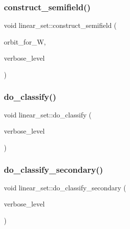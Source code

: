 \mbox{\label{classlinear__set_ab54b164771526ae8d687751aa2d1a9ce}} 
\subsubsection{\texorpdfstring{construct\+\_\+semifield()}{construct\_semifield()}}
{\footnotesize\ttfamily void linear\+\_\+set\+::construct\+\_\+semifield (\begin{DoxyParamCaption}\item[{\mbox{\hyperlink{galois_8h_a09fddde158a3a20bd2dcadb609de11dc}{I\+NT}}}]{orbit\+\_\+for\+\_\+W,  }\item[{\mbox{\hyperlink{galois_8h_a09fddde158a3a20bd2dcadb609de11dc}{I\+NT}}}]{verbose\+\_\+level }\end{DoxyParamCaption})}

\mbox{\label{classlinear__set_a3eb2dbce7fa8b71901dfc12f288ddd0c}} 
\subsubsection{\texorpdfstring{do\+\_\+classify()}{do\_classify()}}
{\footnotesize\ttfamily void linear\+\_\+set\+::do\+\_\+classify (\begin{DoxyParamCaption}\item[{\mbox{\hyperlink{galois_8h_a09fddde158a3a20bd2dcadb609de11dc}{I\+NT}}}]{verbose\+\_\+level }\end{DoxyParamCaption})}

\mbox{\label{classlinear__set_a47eb7f9995f3343abd3bdfbf9a9a9162}} 
\subsubsection{\texorpdfstring{do\+\_\+classify\+\_\+secondary()}{do\_classify\_secondary()}}
{\footnotesize\ttfamily void linear\+\_\+set\+::do\+\_\+classify\+\_\+secondary (\begin{DoxyParamCaption}\item[{\mbox{\hyperlink{galois_8h_a09fddde158a3a20bd2dcadb609de11dc}{I\+NT}}}]{verbose\+\_\+level }\end{DoxyParamCaption})}

